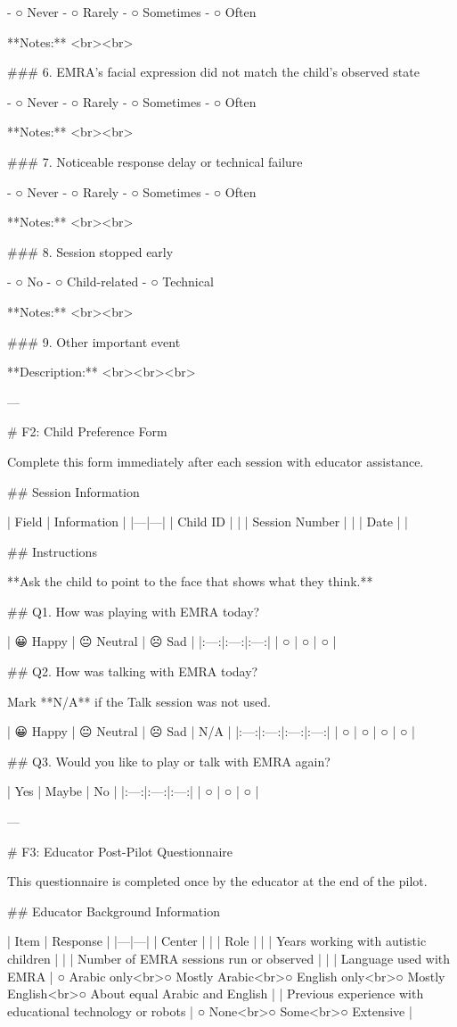 - ○ Never
- ○ Rarely
- ○ Sometimes
- ○ Often

**Notes:**  
<br><br>

### 6. EMRA’s facial expression did not match the child’s observed state

- ○ Never
- ○ Rarely
- ○ Sometimes
- ○ Often

**Notes:**  
<br><br>

### 7. Noticeable response delay or technical failure

- ○ Never
- ○ Rarely
- ○ Sometimes
- ○ Often

**Notes:**  
<br><br>

### 8. Session stopped early

- ○ No
- ○ Child-related
- ○ Technical

**Notes:**  
<br><br>

### 9. Other important event

**Description:**  
<br><br><br>

---

# F2: Child Preference Form

Complete this form immediately after each session with educator assistance.

## Session Information

| Field | Information |
|---|---|
| Child ID | |
| Session Number | |
| Date | |

## Instructions

**Ask the child to point to the face that shows what they think.**

## Q1. How was playing with EMRA today?

| 😀 Happy | 😐 Neutral | ☹️ Sad |
|:---:|:---:|:---:|
| ○ | ○ | ○ |

## Q2. How was talking with EMRA today?

Mark **N/A** if the Talk session was not used.

| 😀 Happy | 😐 Neutral | ☹️ Sad | N/A |
|:---:|:---:|:---:|:---:|
| ○ | ○ | ○ | ○ |

## Q3. Would you like to play or talk with EMRA again?

| Yes | Maybe | No |
|:---:|:---:|:---:|
| ○ | ○ | ○ |

---

# F3: Educator Post-Pilot Questionnaire

This questionnaire is completed once by the educator at the end of the pilot.

## Educator Background Information

| Item | Response |
|---|---|
| Center | |
| Role | |
| Years working with autistic children | |
| Number of EMRA sessions run or observed | |
| Language used with EMRA | ○ Arabic only<br>○ Mostly Arabic<br>○ English only<br>○ Mostly English<br>○ About equal Arabic and English |
| Previous experience with educational technology or robots | ○ None<br>○ Some<br>○ Extensive |

